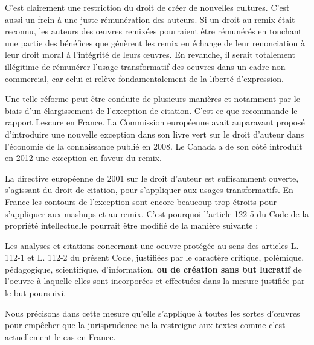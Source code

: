 C’est clairement une restriction du droit de créer de nouvelles cultures. C'est aussi un frein à une juste rémunération des auteurs. Si un droit au remix était reconnu, les auteurs des œuvres remixées pourraient être rémunérés en touchant une partie des bénéfices que génèrent les remix en échange de leur renonciation à leur droit moral à l'intégrité de leurs œuvres. En revanche, il serait totalement illégitime de rémunérer l'usage transformatif des oeuvres dans un cadre non-commercial, car celui-ci relève fondamentalement de la liberté d'expression. 

Une telle réforme peut être conduite de plusieurs manières et notamment par le biais d'un élargissement de l'exception de citation. C’est ce que recommande le rapport Lescure en France. La Commission européenne avait auparavant proposé d'introduire une nouvelle exception dans son livre vert sur le droit d'auteur dans l'économie de la connaissance publié en 2008. Le Canada a de son côté introduit en 2012 une exception en faveur du remix.  

La directive européenne de 2001 sur le droit d’auteur est suffisamment ouverte, s'agissant du droit de citation, pour s'appliquer aux usages transformatifs. En France les contours de l'exception sont encore beaucoup trop étroits pour s'appliquer aux mashups et au remix. C'est pourquoi l’article 122-5 du Code de la propriété intellectuelle pourrait être modifié de la manière suivante :

\begin{mesure}
Les analyses et citations concernant une oeuvre protégée au sens des articles L. 112-1 et L. 112-2 du présent Code, justifiées par le caractère critique, polémique, pédagogique, scientifique, d’information, \textbf{ou de création sans but lucratif} de l’oeuvre à laquelle elles sont incorporées et effectuées dans la mesure justifiée par le but poursuivi.
\end{mesure}

Nous précisons dans cette mesure qu'elle s'applique à toutes les sortes d'œuvres pour empêcher que la jurisprudence ne la restreigne aux textes comme c'est actuellement le cas en France.


